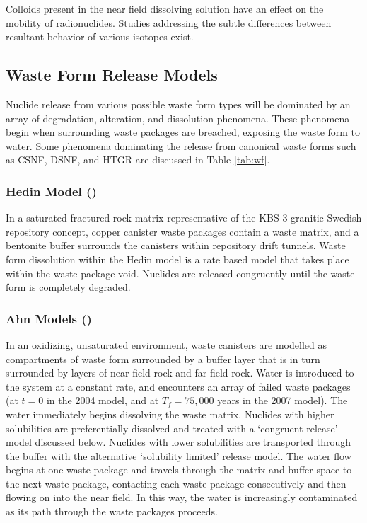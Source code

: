 {Colloids present in the near field dissolving solution have an effect on the
mobility of radionuclides. Studies addressing the subtle differences between 
resultant behavior of various isotopes exist.

\subsection{Waste Form Release Models}

Nuclide release from various possible waste form types will be dominated by an 
array of degradation, alteration, and dissolution phenomena. These phenomena 
begin when surrounding waste packages are breached, exposing the waste form to 
water. Some phenomena dominating the release from canonical waste forms such as  
\gls{CSNF}, \gls{DSNF}, and \gls{HTGR} are discussed in Table \ref{tab:wf}.








\subsubsection{Hedin Model (\cite{hedin_integrated_2002})}

In a saturated fractured rock matrix representative of the KBS-3 granitic
Swedish repository concept, copper canister waste packages contain a waste
matrix, and a bentonite buffer surrounds the canisters within repository drift
tunnels. Waste form dissolution within the Hedin model is a rate based model
that takes place within the waste package void. Nuclides are released
congruently until the waste form is completely degraded.
\cite{hedin_integrated_2002} 

\subsubsection{Ahn Models (\cite{ahn_environmental_2004,
ahn_environmental_2007})}

In an oxidizing, unsaturated environment, waste canisters are modelled as 
compartments of waste form surrounded by a
buffer layer that is in turn surrounded by layers of near field rock and far
field rock. Water is introduced to the system at a constant rate, and
encounters an array of failed waste packages (at $t=0$ in the 2004 model, and
at $T_f=75,000$ years in the 2007 model). The water immediately begins
dissolving the waste matrix.  Nuclides with higher solubilities are
preferentially dissolved and treated with a `congruent release' model discussed
below. Nuclides with lower solubilities are transported through the buffer with
the alternative `solubility limited' release model. The water flow begins at
one waste package and travels through the matrix and buffer space to the next
waste package, contacting each waste package consecutively and then flowing on
into the near field. In this way, the water is increasingly contaminated as its
path through the waste packages proceeds.  

}
